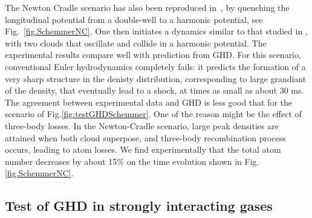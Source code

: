 \documentclass[onecolumn,amsfonts,showpacs,superscriptaddress]{revtex4-1}
\begin{document}
 The Newton Cradle scenario has also been reproduced in~\citep{schemmer2019generalized}, 
 by quenching the longitudinal potential from a double-well to a harmonic potential, see Fig.~\ref{fig.SchemmerNC}. One then initiates a dynamics similar to that studied in \citep{kinoshita2006quantum}, with two clouds that oscillate and collide in a harmonic potential.
 The experimental results compare well with prediction from GHD.
 For this scenario, conventional Euler hydrodynamics completely fails: it predicts the formation of a very sharp structure in the denisty distribution,
  corresponding to large grandiant of the density, that eventually lead to a shock, at times as small as about 30 ms. The agreement between experimental data and GHD is less good that for the scenario of Fig.\ref{fig:testGHDSchemmer}. One of the reason might be the effect of three-body losses. In the Newton-Cradle scenario, large peak densities are attained when both cloud superpose, and three-body recombination process occurs, leading to atom losses. We find experimentally that the total atom number decreases by about 15\% on the time evolution shown in Fig.\ref{fig.SchemmerNC}. 




\subsection{Test of GHD in strongly interacting gases}
\label{subsec:testGHDWeiss}
\end{document}
